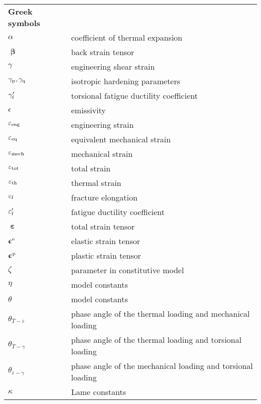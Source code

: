 \renewcommand\arraystretch{1.0}

\begin{table}[htb]
  \centering
    \begin{tabular}{p{3cm}p{10.5cm}}
    \textbf{Greek symbols} & \\
    $\alpha$ & coefficient of thermal expansion \\
    $\bm{\upbeta}$ & back strain tensor \\
    $\gamma$ & engineering shear strain \\
    $\gamma_{\rm{p}}, \gamma_{\rm{q}}$ & isotropic hardening parameters \\
    $\gamma'_{\rm{f}}$ & torsional fatigue ductility coefficient \\
    $\epsilon$ & emissivity \\
    $\varepsilon_{\rm{eng}}$  & engineering strain \\
    $\varepsilon_{\rm{eq}}$  & equivalent mechanical strain \\
    $\varepsilon_{\rm{mech}}$ & mechanical strain \\
    $\varepsilon_{\rm{tot}}$ & total strain \\
    $\varepsilon_{\rm{th}}$ & thermal strain \\
    $\varepsilon_{\rm{f}}$ & fracture elongation \\
    $\varepsilon'_{\rm{f}}$ & fatigue ductility coefficient \\
    $\bm{\upepsilon}$ & total strain tensor \\
    $\bm{\upepsilon}^{\rm{e}}$ & elastic strain tensor \\
    $\bm{\upepsilon}^{\rm{p}}$ & plastic strain tensor \\
    $\zeta$ & parameter in constitutive model \\
    $\eta$ & model constants \\
    $\theta$ & model constants \\
    $\theta_{T-\varepsilon}$ & phase angle of the thermal loading and mechanical loading \\
    $\theta_{T-\gamma}$ & phase angle of the thermal loading and torsional loading \\
    $\theta_{\varepsilon-\gamma}$ & phase angle of the mechanical loading and torsional loading \\
    $\kappa$ & Lame constants \\

\end{tabular}
\end{table}
